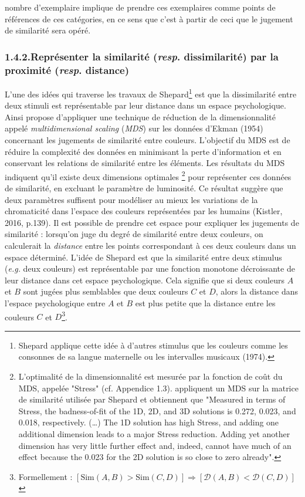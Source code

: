 \documentclass{article}
\begin{document}
nombre d’exemplaire implique de prendre ces exemplaires comme \og points de références \fg de ces catégories, en ce sens que c’est à partir de ceci que le jugement de similarité sera opéré.

\subsubsection*{1.4.2.\quad Représenter la similarité (\textit{resp}. dissimilarité) par la proximité (\textit{resp}. distance)}

L’une des idées qui traverse les travaux de Shepard\footnote{Shepard applique cette idée à d'autres stimulus que les couleurs comme les consonnes de sa langue maternelle ou les intervalles musicaux (1974).} est que la dissimilarité entre deux stimuli est représentable par leur distance dans un espace psychologique. Ainsi \textcite[]{shepard_1962} propose d’appliquer une technique de réduction de la dimensionnalité appelé \textit{multidimensional scaling} (\textit{MDS}) sur les données d’Ekman (1954) concernant les jugements de similarité entre couleurs. L'objectif du MDS est de réduire la complexité des données en minimisant la perte d'information et en conservant les relations de similarité entre les éléments. Les résultats du MDS indiquent qu'il existe deux dimensions optimales \footnote{L’optimalité de la dimensionnalité est mesurée par la fonction de coût du MDS, appelée "Stress" (cf. Appendice 1.3). \textcite[p.66]{borg_Groenen_2005} appliquent un MDS sur la matrice de similarité utilisée par Shepard et obtiennent que "Measured in terms of Stress, the badness-of-fit of the 1D, 2D, and 3D solutions is 0.272, 0.023, and 0.018, respectively. (…) The 1D solution has high Stress, and adding one additional dimension leads to a major Stress reduction. Adding yet another dimension has very little further effect and, indeed, cannot have much of an effect because the 0.023 for the 2D solution is so close to zero already".} pour représenter ces données de similarité, en excluant le paramètre de luminosité. Ce résultat suggère que deux paramètres suffisent pour modéliser au mieux les variations de la chromaticité dans l’espace des couleurs représentées par les humains (Kistler, 2016, p.139). Il est possible de prendre cet espace pour expliquer les jugements de similarité : lorsqu’on juge du degré de similarité entre deux couleurs, on calculerait la \textit{distance} entre les points correspondant à ces deux couleurs dans un espace déterminé. L’idée de Shepard est que la similarité entre deux stimulus (\textit{e.g.} deux couleurs) est représentable par une fonction monotone décroissante de leur distance dans cet espace psychologique. Cela signifie que si deux couleurs $A$ et $B$ sont jugées plus semblables que deux couleurs $C$ et $D$, alors la distance dans l’espace psychologique entre $A$ et $B$ est plus petite que la distance entre les couleurs $C$ et $D$\footnote{Formellement : $\left[ \text{Sim}(A,B) > \text{Sim}(C,D) \right] \Rightarrow \left[ \mathcal{D}(A,B) < \mathcal{D}(C,D) \right]$}.
\end{document}
